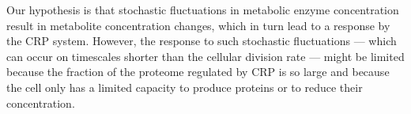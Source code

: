 Our hypothesis is that stochastic fluctuations in metabolic enzyme concentration result in metabolite concentration changes, which in turn lead to a response by the CRP system.
%
%
%
However, 
the response to such stochastic fluctuations --- which can occur on timescales shorter than the cellular division rate --- might be limited because 
the fraction of the proteome regulated by CRP is so large 
and because the cell only has a limited capacity to produce proteins or to reduce their concentration.
%
%
%
%



